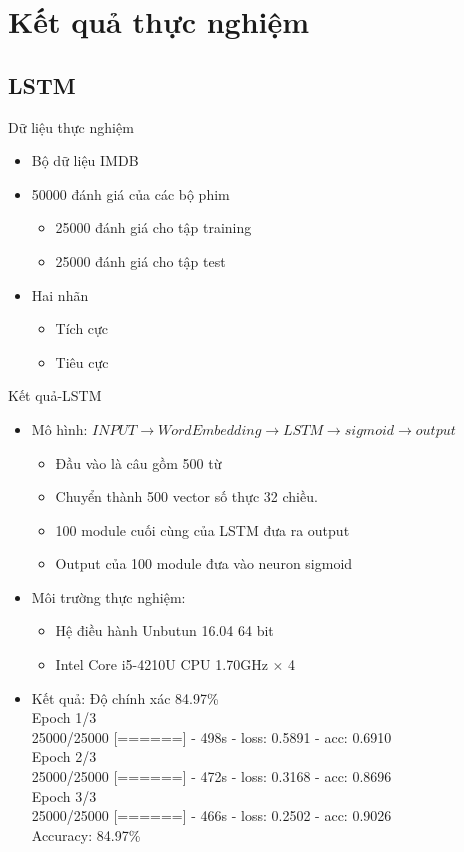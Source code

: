 \documentclass[compress]{beamer}
\begin{document}
\section{Kết quả thực nghiệm}
\subsection{LSTM}
\begin{frame}{Dữ liệu thực nghiệm}
\begin{itemize}
\item Bộ dữ liệu IMDB
\item 50000 đánh giá của các bộ phim
\begin{itemize}
\item 25000 đánh giá cho tập training
\item 25000 đánh giá cho tập test 
\end{itemize}
\item Hai nhãn
\begin{itemize}
\item Tích cực
\item Tiêu cực
\end{itemize}
\end{itemize}
\end{frame}

\begin{frame}{Kết quả-LSTM}
\begin{itemize}
\item Mô hình: $INPUT \rightarrow WordEmbedding \rightarrow LSTM \rightarrow sigmoid \rightarrow output$
\begin{itemize}
\item Đầu vào là câu gồm 500 từ
\item Chuyển thành 500 vector số thực 32 chiều.
\item 100 module cuối cùng của LSTM đưa ra output 
\item Output của 100 module đưa vào neuron sigmoid
\end{itemize}
\item Môi trường thực nghiệm:
\begin{itemize}
\item Hệ điều hành Unbutun 16.04 64 bit
\item Intel Core i5-4210U CPU 1.70GHz $\times$ 4
\end{itemize}
\item Kết quả: Độ chính xác 84.97\%
\\[0.2cm]{\small
Epoch 1/3\\
25000/25000 [======] - 498s - loss: 0.5891 - acc: 0.6910\\
Epoch 2/3\\
25000/25000 [======] - 472s - loss: 0.3168 - acc: 0.8696\\   
Epoch 3/3\\
25000/25000 [======] - 466s - loss: 0.2502 - acc: 0.9026\\[0.2cm]
Accuracy: 84.97\% \\
}
\end{itemize}
\end{frame}
\end{document}
